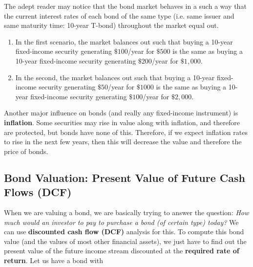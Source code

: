 \documentclass{article}
\begin{document}
    The adept reader may notice that the bond market behaves in a such a way that the current interest rates of each bond of the same type (i.e. same issuer and same maturity time: 10-year T-bond) throughout the market equal out.

    \begin{enumerate}
      \item In the first scenario, the market balances out such that buying a 10-year fixed-income security generating $\$100$/year for $\$500$ is the same as buying a 10-year fixed-income security generating $\$200$/year for $\$1,000$.
      \item In the second, the market balances out such that buying a 10-year fixed-income security generating $\$50$/year for $\$1000$ is the same as buying a 10-year fixed-income security generating $\$100$/year for $\$2,000$.
    \end{enumerate}

    Another major influence on bonds (and really any fixed-income instrument) is \textbf{inflation}. Some securities may rise in value along with inflation, and therefore are protected, but bonds have none of this. Therefore, if we expect inflation rates to rise in the next few years, then this will decrease the value and therefore the price of bonds.

  \subsection{Bond Valuation: Present Value of Future Cash Flows (DCF)}

    When we are valuing a bond, we are basically trying to answer the question: \textit{How much would an investor to pay to purchase a bond (of certain type) today?} We can use \textbf{discounted cash flow (DCF)} analysis for this. To compute this bond value (and the values of most other financial assets), we just have to find out the present value of the future income stream discounted at the \textbf{required rate of return}. Let us have a bond with
\end{document}
